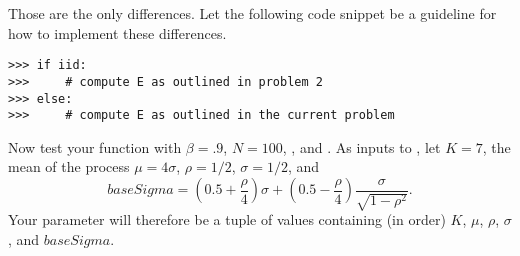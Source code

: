 \begin{problem}
Those are the only differences. Let the following code snippet be a guideline for how to implement
these differences.
\begin{lstlisting}
>>> if iid:
>>>     # compute E as outlined in problem 2
>>> else:
>>>     # compute E as outlined in the current problem
\end{lstlisting}

Now test your function with $\beta = .9$, $N = 100$, , and .
As inputs to , let $K=7$, the mean of the process
$\mu=4\sigma$, $\rho = 1/2$, $\sigma=1/2$, and
\[baseSigma=(0.5+\frac{\rho}{4})\sigma +
(0.5 - \frac{\rho}{4})\frac{\sigma}{\sqrt{1-\rho^2}}.
\]
Your  parameter will therefore be a tuple of values containing (in order)
$K$, $\mu$, $\rho$, $\sigma$, and $baseSigma$.
\end{problem} 